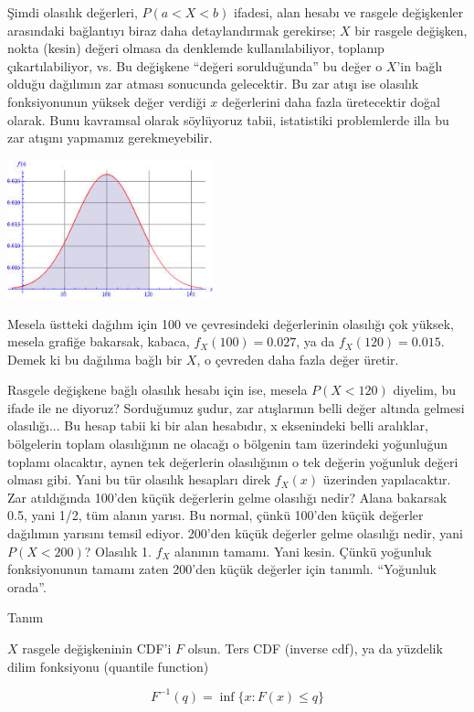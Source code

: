 \documentclass[12pt,fleqn]{article}\usepackage{../../common}
\begin{document}
Şimdi olasılık değerleri, $P(a < X < b)$ ifadesi, alan hesabı ve rasgele
değişkenler arasındaki bağlantıyı biraz daha detaylandırmak gerekirse; $X$
bir rasgele değişken, nokta (kesin) değeri olmasa da denklemde
kullanılabiliyor, toplanıp çıkartılabiliyor, vs. Bu değişkene ``değeri
sorulduğunda'' bu değer o $X$'in bağlı olduğu dağılımın zar atması
sonucunda gelecektir. Bu zar atışı ise olasılık fonksiyonunun yüksek değer
verdiği $x$ değerlerini daha fazla üretecektir doğal olarak. Bunu kavramsal
olarak söylüyoruz tabii, istatistiki problemlerde illa bu zar atışını
yapmamız gerekmeyebilir.

\includegraphics[height=4cm]{stat_intro_10.png}

Mesela üstteki dağılım için 100 ve çevresindeki değerlerinin olasılığı çok
yüksek, mesela grafiğe bakarsak, kabaca, $f_X(100) = 0.027$, ya da
$f_X(120) = 0.015$.  Demek ki bu dağılıma bağlı bir $X$, o çevreden daha
fazla değer üretir.

Rasgele değişkene bağlı olasılık hesabı için ise, mesela $P(X < 120)$
diyelim, bu ifade ile ne diyoruz? Sorduğumuz şudur, zar atışlarının belli
değer altında gelmesi olasılığı... Bu hesap tabii ki bir alan hesabıdır, x
eksenindeki belli aralıklar, bölgelerin toplam olasılığının ne olacağı o
bölgenin tam üzerindeki yoğunluğun toplamı olacaktır, aynen tek
değerlerin olasılığının o tek değerin yoğunluk değeri olması gibi. Yani
bu tür olasılık hesapları direk $f_X(x)$ üzerinden yapılacaktır. Zar
atıldığında 100'den küçük değerlerin gelme olasılığı nedir? Alana bakarsak
0.5, yani 1/2, tüm alanın yarısı. Bu normal, çünkü 100'den küçük değerler
dağılımın yarısını temsil ediyor. 200'den küçük değerler gelme olasılığı
nedir, yani $P(X < 200)$? Olasılık 1. $f_X$ alanının tamamı. Yani
kesin. Çünkü yoğunluk fonksiyonunun tamamı zaten 200'den küçük değerler
için tanımlı. ``Yoğunluk orada''.

Tanım

$X$ rasgele değişkeninin CDF'i $F$ olsun. Ters CDF (inverse cdf), ya da yüzdelik
dilim fonksiyonu (quantile function)

$$ F^{-1}(q) = \inf \bigg\{ x: F(x) \le q \bigg\} $$
\end{document}
